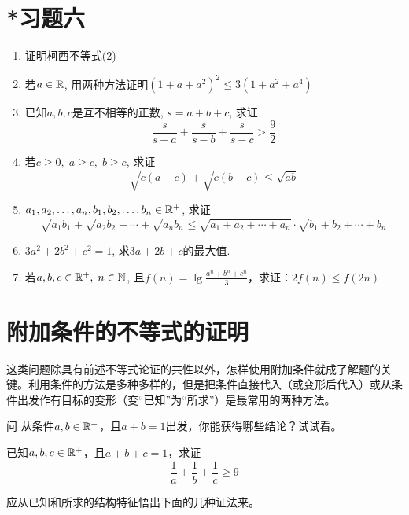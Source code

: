 \section*{*习题六}
\begin{enumerate}
    \item 证明柯西不等式(2)
    \item 若$a\in \mathbb{R}$, 用两种方法证明$(1+a+a^2)^2\le 3(1+a^2+a^4)$
    \item 已知$a,b,c$是互不相等的正数, $s=a+b+c$, 求证
    $$\frac{s}{s-a}+\frac{s}{s-b}+\frac{s}{s-c}>\frac{9}{2}$$
    \item 若$c\ge 0,\; a\ge c,\; b\ge c$, 求证
    \[\sqrt{c(a-c)}+\sqrt{c(b-c)}\le \sqrt{ab}\]
    \item $a_{1},a_{2},\ldots,a_{n}, b_{1},b_{2},\ldots,b_{n}\in \mathbb{R}^{+}$, 求证
    \[\sqrt{a_{1}b_{1}}+\sqrt{a_{2}b_{2}}+\cdots+\sqrt{a_{n}b_{n}}\le \sqrt{a_{1}+a_{2}+\cdots+a_{n}}\cdot \sqrt{b_{1}+b_{2}+\cdots+b_{n}}\]
    \item $3a^{2}+2b^{2}+c^{2}=1$, 求$3a+2b+c$的最大值.
    \item 若$a,b,c\in \mathbb{R}^{+},\; n\in \mathbb{N}$, 且$f(n)=\lg \frac{a^n+b^n+c^n}{3}$，求证：$2f(n)\le f(2n)$
\end{enumerate}

\section{附加条件的不等式的证明}
这类问题除具有前述不等式论证的共性以外，怎样使用附加条件就成了解题的关键。利用条件的方法是多种多样的，但是把条件直接代入（或变形后代入）或从条件出发作有目标的变形（变“已知”为“所求”）是最常用的两种方法。

\begin{thm}
{问} 从条件$a,b\in\mathbb{R}^+$，且$a+b=1$出发，你能获得哪些结论？试试看。    
\end{thm}

\begin{example}
已知$a,b,c\in\mathbb{R}^+$，且$a+b+c=1$，求证
\begin{equation}
    \frac{1}{a}+\frac{1}{b}+\frac{1}{c}\ge 9
\end{equation}
\end{example}

\begin{analyze}
    应从已知和所求的结构特征悟出下面的几种证法来。
\end{analyze}

